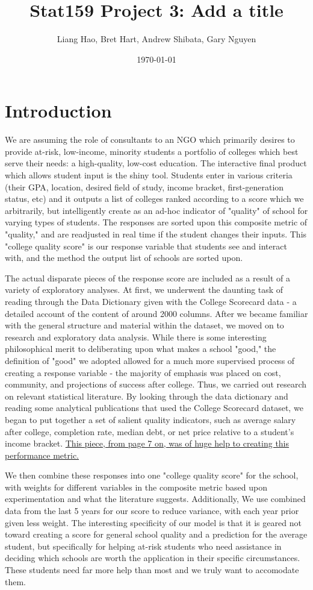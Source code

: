 \documentclass{article}
\title{Stat159 Project 3: Add a title}
\author{Liang Hao, Bret Hart, Andrew Shibata, Gary Nguyen}
\date{\today}
\begin{document}


\maketitle
\section{Introduction}

We are assuming the role of consultants to an NGO which primarily desires to provide at-risk, low-income, minority students a portfolio of colleges which best serve their needs: a high-quality, low-cost education. The interactive final product which allows student input is the shiny tool. Students enter in various criteria (their GPA, location, desired field of study, income bracket, first-generation status, etc) and it outputs a list of colleges ranked according to a score which we arbitrarily, but intelligently create as an ad-hoc indicator of "quality" of school for varying types of students. The responses are sorted upon this composite metric of "quality," and are readjusted in real time if the student changes their inputs. This "college quality score" is our response variable that students see and interact with, and the method the output list of schools are sorted upon. 

The actual disparate pieces of the response score are included as a result of a variety of exploratory analyses. At first, we underwent the daunting task of reading through the Data Dictionary given with the College Scorecard data - a detailed account of the content of around 2000 columns. After we became familiar with the general structure and material within the dataset, we moved on to research and exploratory data analysis. While there is some interesting philosophical merit to deliberating upon what makes a school "good," the definition of "good" we adopted allowed for a much more supervised process of creating a response variable - the majority of emphasis was placed on cost, community, and projections of success after college. Thus, we carried out research on relevant statistical literature. By looking through the data dictionary and reading some analytical publications that used the College Scorecard dataset, we began to put together a set of salient quality indicators, such as average salary after college, completion rate, median debt, or net price relative to a student's income bracket. \href{http://bit.ly/2gGW2fG}{This piece, from page 7 on, was of huge help to creating this performance metric.}   

We then combine these responses into one "college quality score" for the school, with weights for different variables in the composite metric based upon experimentation and what the literature suggests. Additionally, We use combined data from the last 5 years for our score to reduce variance, with each year prior given less weight. The interesting specificity of our model is that it is geared not toward creating a score for general school quality and a prediction for the average student, but specifically for helping at-risk students who need assistance in deciding which schools are worth the application in their specific circumstances. These students need far more help than most and we truly want to accomodate them.
\end{document}
